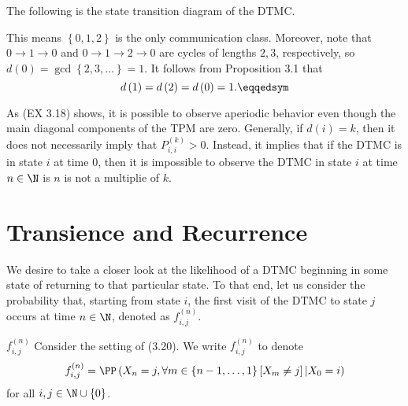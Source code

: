 \documentclass[stat333]{subfiles}
\begin{document}
    \begin{subproof}[Answer]
        The following is the state transition diagram of the DTMC.
        \begin{center}
        \end{center}
        This means $\left\lbrace 0,1,2 \right\rbrace$ is the only communication class. Moreover, note that $0\to 1\to 0$ and $0\to 1\to 2\to 0$ are cycles of lengths $2,3$, respectively, so $d\left( 0 \right)=\gcd\left\lbrace 2,3,\ldots \right\rbrace=1$. It follows from Proposition 3.1 that
        \begin{equation*}
            d\left( 1 \right)=d\left( 2 \right)=d\left( 0 \right)=1. \eqqedsym
        \end{equation*}
    \end{subproof}

    \np As (EX 3.18) shows, it is possible to observe aperiodic behavior even though the main diagonal components of the TPM are zero. Generally, if $d\left( i \right)=k$, then it does not necessarily imply that $P^{\left( k \right)}_{i,i}>0$. Instead, it implies that if the DTMC is in state $i$ at time $0$, then it is impossible to observe the DTMC in state $i$ at time $n\in\N$ is $n$ is not a multiplie of $k$.

    \section{Transience and Recurrence}
    
    \np We desire to take a closer look at the likelihood of a DTMC beginning in some state of returning to that particular state. To that end, let us consider 
    the probability that, starting from state $i$, the first visit of the DTMC to state $j$ occurs at time $n\in\N$, denoted as $f^{\left( n \right)}_{i,j}$.

    \begin{notation}{$f^{\left( n \right)}_{i,j}$}{}
        Consider the setting of (3.20). We write $f^{\left( n \right)}_{i,j}$ to denote 
        \begin{equation*}
            f^{\left( n \right)}_{i,j} = \PP\left( X_n=j,\forall m\in\left\lbrace n-1,\ldots,1 \right\rbrace\left[ X_m\neq j \right]|X_0=i \right)
        \end{equation*}
        for all $i,j\in\N\cup\left\lbrace 0 \right\rbrace$.
    \end{notation}
\end{document}
